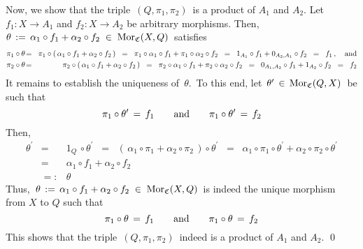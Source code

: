 \begin{enumerate}
	\vskip 0.1cm
	\noindent
	Now, we show that the triple \,$(Q,\pi_{1},\pi_{2})$\, is a product of $A_{1}$ and $A_{2}$.
	Let $f_{1} : X \longrightarrow A_{1}$ and $f_{2} : X \longrightarrow A_{2}$ be arbitrary morphisms.
	Then,
	\,$\theta \, := \, \alpha_{1} \circ f_{1} + \alpha_{2} \circ f_{2} \;\in\; \textnormal{Mor}_{\mathfrak{C}}(X,Q)$\,
	satisfies
	\begin{eqnarray*}
	\pi_{1} \circ \theta
	& \!=\! &
		\pi_{1} \circ (\,\alpha_{1} \circ f_{1} + \alpha_{2} \circ f_{2}\,)
	\;\; = \;\;
		\pi_{1} \circ \alpha_{1} \circ f_{1} + \pi_{1} \circ \alpha_{2} \circ f_{2}
	\;\; = \;\;
		1_{A_{1}} \circ f_{1} + 0_{A_{2},A_{1}} \circ f_{2} 
	\;\; = \;\;
		f_{1}\,,
	\quad\textnormal{and}
	\\
	\pi_{2} \circ \theta
	& \!=\! &
		\pi_{2} \circ (\,\alpha_{1} \circ f_{1} + \alpha_{2} \circ f_{2}\,)
	\;\; = \;\;
		\pi_{2} \circ \alpha_{1} \circ f_{1} + \pi_{2} \circ \alpha_{2} \circ f_{2}
	\;\; = \;\;
		0_{A_{1},A_{2}} \circ f_{1}  + 1_{A_{2}} \circ f_{2}
	\;\; = \;\;
		f_{2}
	\end{eqnarray*}
	It remains to establish the uniqueness of \,$\theta$.\,
	To this end, let \,$\theta^{\prime} \,\in\, \textnormal{Mor}_{\mathfrak{C}}(Q,X)$\, be such that
	\begin{equation*}
	\pi_{1} \circ \theta^{\prime} \,=\, f_{1}
	\quad\quad\textnormal{and}\quad\quad
	\pi_{1} \circ \theta^{\prime} \,=\, f_{2}
	\end{equation*}
	Then,
	\begin{eqnarray*}
	\theta^{\prime}
	& = &
		1_{Q} \,\circ \theta^{\prime} 
	\;\; = \;\;
		(\,\alpha_{1} \circ \pi_{1} + \alpha_{2} \circ \pi_{2}\,) \circ \theta^{\prime}
	\;\; = \;\;
		\alpha_{1} \circ \pi_{1} \circ \theta^{\prime} + \alpha_{2} \circ \pi_{2} \circ \theta^{\prime}
	\\
	& = &
		\alpha_{1} \circ f_{1} + \alpha_{2} \circ f_{2}
	\\
	& =: &
		\theta
	\end{eqnarray*}
	Thus,
	\,$\theta \, := \, \alpha_{1} \circ f_{1} + \alpha_{2} \circ f_{2} \;\in\; \textnormal{Mor}_{\mathfrak{C}}(X,Q)$\,
	is indeed the unique morphism from $X$ to $Q$ such that
	\begin{equation*}
	\pi_{1} \circ \theta \,=\, f_{1}
	\quad\quad\textnormal{and}\quad\quad
	\pi_{1} \circ \theta \,=\, f_{2}
	\end{equation*}
	This shows that the triple \,$(Q,\pi_{1},\pi_{2})$\, indeed is a product of $A_{1}$ and $A_{2}$.
	\qed
\end{enumerate}

